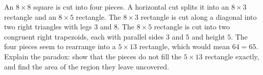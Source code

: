 An $8\times8$ square is cut into four pieces. A horizontal cut splits it into an $8\times3$ rectangle and an $8\times5$ rectangle. The $8\times3$ rectangle is cut along a diagonal into two right triangles with legs $3$ and $8$. The $8\times5$ rectangle is cut into two congruent right trapezoids, each with parallel sides $3$ and $5$ and height $5$. The four pieces seem to rearrange into a $5\times13$ rectangle, which would mean $64=65$. Explain the paradox: show that the pieces do not fill the $5\times13$ rectangle exactly, and find the area of the region they leave uncovered.
